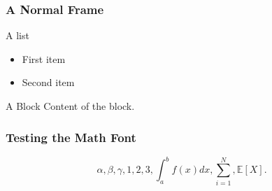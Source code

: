 \documentclass{beamer}
\begin{document}
\appendix


\begin{frame} \frametitle{A Normal Frame}
A list
\begin{itemize}
\item First item
\item Second item
\end{itemize}

\begin{block}{A Block}
Content of the block.
\end{block}
\end{frame}

\begin{frame} \frametitle{Testing the Math Font}
\begin{equation*}
\alpha, \beta, \gamma, 1, 2, 3, \int_a^b f(x)dx, \sum_{i=1}^N, \mathbb{E}[X].
\end{equation*}
\end{frame}
\end{document}
